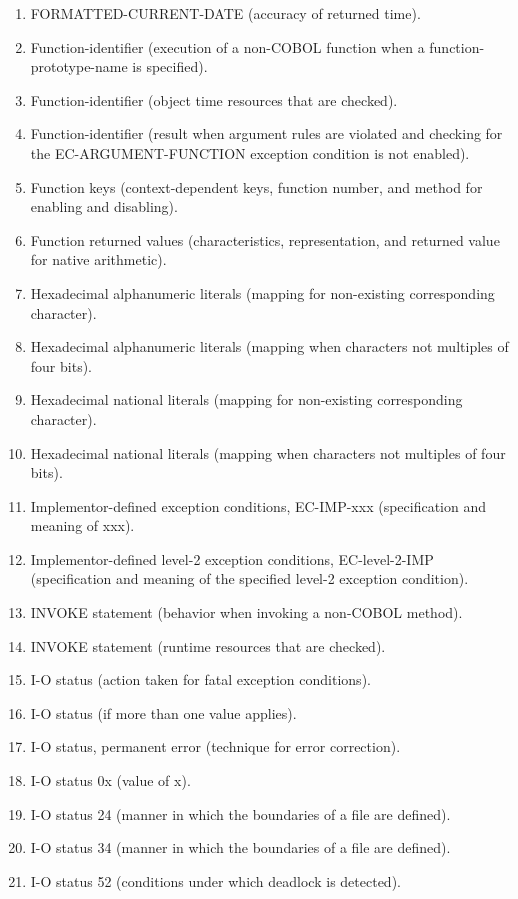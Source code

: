 \begin{enumerate}
\item FORMATTED-CURRENT-DATE (accuracy of returned time).
\item Function-identifier (execution of a non-COBOL function when a function-prototype-name is specified).
\item Function-identifier (object time resources that are checked).
\item Function-identifier (result when argument rules are violated and checking for the EC-ARGUMENT-FUNCTION
  exception condition is not enabled).
\item Function keys (context-dependent keys, function number, and method for enabling and disabling).
\item Function returned values (characteristics, representation, and returned value for native arithmetic).
\item Hexadecimal alphanumeric literals (mapping for non-existing corresponding character).
\item Hexadecimal alphanumeric literals (mapping when characters not multiples of four bits).
\item Hexadecimal national literals (mapping for non-existing corresponding character).
\item Hexadecimal national literals (mapping when characters not multiples of four bits).
\item Implementor-defined exception conditions, EC-IMP-xxx (specification and meaning of xxx).
\item Implementor-defined level-2 exception conditions, EC-level-2-IMP (specification and meaning of the specified level-2 exception condition).
\item INVOKE statement (behavior when invoking a non-COBOL method).
\item INVOKE statement (runtime resources that are checked).
\item I-O status (action taken for fatal exception conditions).
\item I-O status (if more than one value applies).
\item I-O status, permanent error (technique for error correction).
\item I-O status 0x (value of x).
\item I-O status 24 (manner in which the boundaries of a file are defined).
\item I-O status 34 (manner in which the boundaries of a file are defined).
\item I-O status 52 (conditions under which deadlock is detected).

\end{enumerate}

